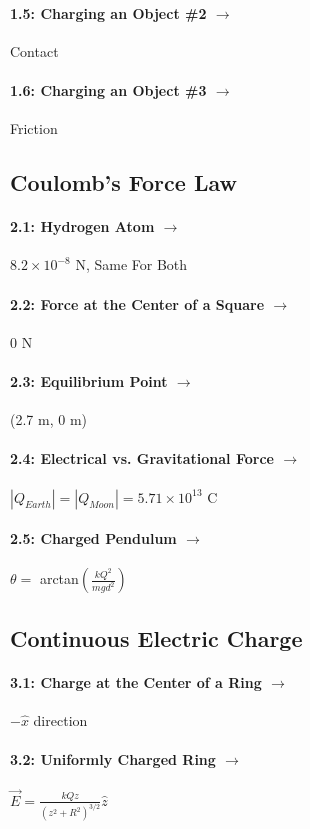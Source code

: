 \documentclass[11pt]{article}
\begin{document}
\paragraph{1.5: Charging an Object \#2 $\rightarrow$} Contact
\paragraph{1.6: Charging an Object \#3 $\rightarrow$} Friction
\vspace{15pt}

\subsection*{Coulomb's Force Law}
\paragraph{2.1: Hydrogen Atom $\rightarrow$} $8.2 \times 10^{-8}$ N, Same For Both
\paragraph{2.2: Force at the Center of a Square $\rightarrow$} 0 N
\paragraph{2.3: Equilibrium Point $\rightarrow$} (2.7 m, 0 m)
\paragraph{2.4: Electrical vs. Gravitational Force $\rightarrow$} $|Q_{Earth}| = |Q_{Moon}| = 5.71\times10^{13}$ C
\paragraph{2.5: Charged Pendulum $\rightarrow$} $\theta =$ arctan$(\frac{kQ^2}{mgd^2})$
\vspace{15pt}

\subsection*{Continuous Electric Charge}
\paragraph{3.1: Charge at the Center of a Ring $\rightarrow$} $-\hat{x}$ direction
\paragraph{3.2: Uniformly Charged Ring $\rightarrow$} $\vec{E} = \frac{kQz}{(z^2 + R^2)^{3/2}}\hat{z}$
\end{document}
